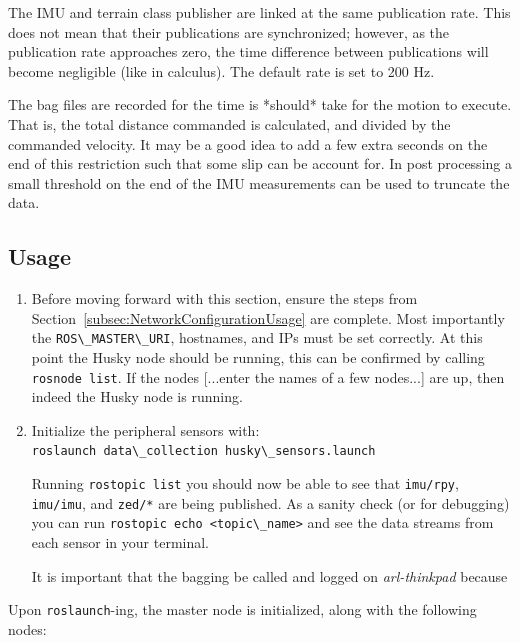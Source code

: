 \documentclass[
	12pt, %
]{fphw}
\newcommand{\code}[1]{\colorbox{light-gray}{\lstinline|#1|}}
\begin{document}
The IMU and terrain class publisher are linked at the same publication rate. This does not mean that their publications are synchronized; however, as the publication rate approaches zero, the time difference between publications will become negligible (like in calculus). The default rate is set to 200 Hz.

The bag files are recorded for the time is *should* take for the motion to execute. That is, the total distance commanded is calculated, and divided by the commanded velocity. It may be a good idea to add a few extra seconds on the end of this restriction such that some slip can be account for. In post processing a small threshold on the end of the IMU measurements can be used to truncate the data.

\subsection{Usage}

\begin{enumerate}
\item Before moving forward with this section, ensure the steps from Section~\ref{subsec:NetworkConfigurationUsage} are complete. Most importantly the \code{ROS\_MASTER\_URI}, hostnames, and IPs must be set correctly. At this point the Husky node should be running, this can be confirmed by calling \code{rosnode list}. If the nodes [...enter the names of a few nodes...] are up, then indeed the Husky node is running.
	
\item Initialize the peripheral sensors with: \\
  \code{roslaunch data\_collection husky\_sensors.launch}
  
  \qquad Running \code{rostopic list} you should now be able to see that \code{imu/rpy}, \code{imu/imu}, and \code{zed/*} are being published. As a sanity check (or for debugging) you can run \code{rostopic echo <topic\_name>} and see the data streams from each sensor in your terminal.

  It is important that the bagging be called and logged on \emph{arl-thinkpad} because

\end{enumerate}

Upon \code{roslaunch}-ing, the master node is initialized, along with the following nodes:

\end{document}
